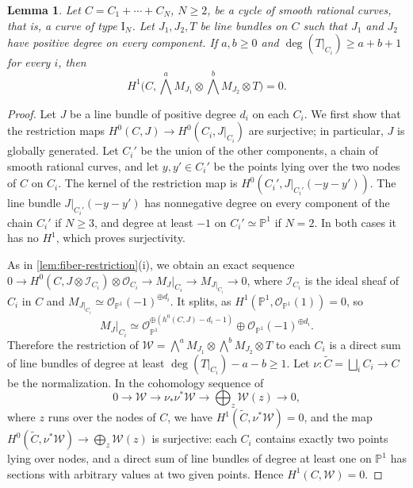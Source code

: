 \documentclass[11pt,reqno]{amsart}
\numberwithin{equation}{section}
\newtheorem{lemma}[lemma]{Lemma}
\theoremstyle{remark}
\newcommand{\sshf}[1]{\mathcal{O}_{#1}}
\newcommand{\prj}[1]{\mathbb{P}^{#1}}
\begin{document}
\begin{lemma}\label{lem:halphen-cycle}
Let \(C=C_1+\cdots+C_N\), \(N\geq2\), be a cycle of smooth rational curves, that is, a curve of type \(\mathrm I_N\). Let \(J_1,J_2,T\) be line bundles on \(C\) such that \(J_1\) and \(J_2\) have positive degree on every component. If \(a,b\geq0\) and \(\deg(T|_{C_i})\geq a+b+1\) for every \(i\), then
\[
 H^1\bigl(C,\textstyle\bigwedge^aM_{J_1}\otimes\bigwedge^bM_{J_2}\otimes T\bigr)=0.
\]
\end{lemma}

\begin{proof}
Let \(J\) be a line bundle of positive degree \(d_i\) on each \(C_i\). We first show that the restriction maps \(H^0(C,J)\to H^0(C_i,J|_{C_i})\) are surjective; in particular, \(J\) is globally generated. Let \(C_i'\) be the union of the other components, a chain of smooth rational curves, and let \(y,y'\in C_i'\) be the points lying over the two nodes of \(C\) on \(C_i\). The kernel of the restriction map is \(H^0(C_i',J|_{C_i'}(-y-y'))\). The line bundle \(J|_{C_i'}(-y-y')\) has nonnegative degree on every component of the chain \(C_i'\) if \(N\geq3\), and degree at least \(-1\) on \(C_i'\simeq\prj{1}\) if \(N=2\). In both cases it has no \(H^1\), which proves surjectivity.

As in \cref{lem:fiber-restriction}\textup{(i)}, we obtain an exact sequence \(0\to H^0(C,J\otimes\mathscr I_{C_i})\otimes\sshf{C_i}\to M_J|_{C_i}\to M_{J|_{C_i}}\to0\), where \(\mathscr I_{C_i}\) is the ideal sheaf of \(C_i\) in \(C\) and \(M_{J|_{C_i}}\simeq\sshf{\prj{1}}(-1)^{\oplus d_i}\). It splits, as \(H^1(\prj{1},\sshf{\prj{1}}(1))=0\), so
\[
 M_J|_{C_i}\simeq\sshf{\prj{1}}^{\oplus(h^0(C,J)-d_i-1)}\oplus\sshf{\prj{1}}(-1)^{\oplus d_i}.
\]
Therefore the restriction of \(\mathcal W=\bigwedge^aM_{J_1}\otimes\bigwedge^bM_{J_2}\otimes T\) to each \(C_i\) is a direct sum of line bundles of degree at least \(\deg(T|_{C_i})-a-b\geq1\). Let \(\nu\colon\widetilde C=\bigsqcup_iC_i\to C\) be the normalization. In the cohomology sequence of
\[
 0\longrightarrow\mathcal W\longrightarrow\nu_*\nu^*\mathcal W\longrightarrow\bigoplus_{z}\mathcal W(z)\longrightarrow0,
\]
where \(z\) runs over the nodes of \(C\), we have \(H^1(\widetilde C,\nu^*\mathcal W)=0\), and the map \(H^0(\widetilde C,\nu^*\mathcal W)\to\bigoplus_z\mathcal W(z)\) is surjective: each \(C_i\) contains exactly two points lying over nodes, and a direct sum of line bundles of degree at least one on \(\prj{1}\) has sections with arbitrary values at two given points. Hence \(H^1(C,\mathcal W)=0\).
\end{proof}
\end{document}
